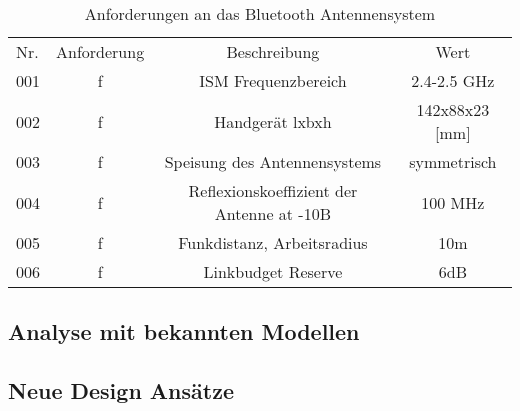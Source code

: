 
\begin{table}[htb]
 \centering
\begin{tabular}{lccc}\toprule 
Nr. & Anforderung & Beschreibung & Wert   \\ 
001 & f & ISM Frequenzbereich  & 2.4-2.5 GHz  \\ 
002 & f & Handgerät lxbxh & 142x88x23 [mm]    \\  
003 & f &  Speisung des Antennensystems & symmetrisch  \\  
004 & f & Reflexionskoeffizient der Antenne  at -10B & 100 MHz  \\ 
005 & f & Funkdistanz, Arbeitsradius & 10m   \\ 
006 & f & Linkbudget Reserve & 6dB   \\ \bottomrule
  \end{tabular}
  \caption{Anforderungen an das Bluetooth Antennensystem}
  \label{AnforderungenAntenneSystem}
\end{table} 



\subsection{Analyse mit bekannten Modellen}
\subsection{Neue Design Ansätze}